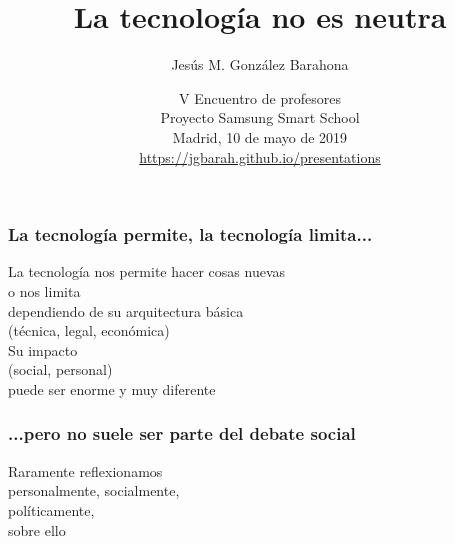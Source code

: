 \documentclass[17pt,aspectratio=169]{beamer}
\begin{document}
\title{La tecnología no es neutra}
\author{Jesús M. González Barahona}

\date{V Encuentro de profesores \\
  Proyecto Samsung Smart School \\
  Madrid, 10 de mayo de 2019\\
{\small \url{https://jgbarah.github.io/presentations}} \\}

\frame{
\maketitle
}





\begin{frame}
\frametitle{La tecnología permite, la tecnología limita...}

\begin{flushright}
La tecnología nos permite hacer cosas nuevas \\
o nos limita \\
dependiendo de su arquitectura básica \\
(técnica, legal, económica) \\
\vspace{.5cm}
Su impacto \\
(social, personal) \\
puede ser enorme y muy diferente \\
\end{flushright}

\end{frame}


\begin{frame}
\frametitle{...pero no suele ser parte del debate social}

\begin{center}
{\Large
Raramente reflexionamos\\
personalmente, socialmente, \\
políticamente, \\
sobre ello \\
}
\end{center}

\end{frame}
\end{document}
